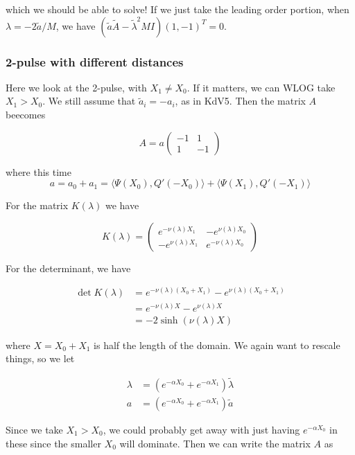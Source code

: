 \documentclass[12pt]{article}
\begin{document}
which we should be able to solve! If we just take the leading order portion, when $\lambda = -2 \tilde{a} / M$, we have $(\tilde{a} \tilde{A} - \tilde{\lambda}^2 M I) (1, -1)^T = 0$.

\subsubsection{2-pulse with different distances}

Here we look at the 2-pulse, with $X_1 \neq X_0$. If it matters, we can WLOG take $X_1 > X_0$. We still assume that $\tilde{a}_i = -a_i$, as in KdV5. Then the matrix $A$ beecomes

\[
A = a \begin{pmatrix}
-1 & 1 \\
1 & -1
\end{pmatrix}
\]

where this time
\[
a = a_0 + a_1 
= \langle \Psi(X_0), Q'(-X_0) \rangle + \langle \Psi(X_1), Q'(-X_1) \rangle
\]

For the matrix $K(\lambda)$ we have

\begin{equation}
K(\lambda) = 
\begin{pmatrix}
e^{-\nu(\lambda)X_1} & -e^{\nu(\lambda)X_0} \\
-e^{\nu(\lambda)X_1} & e^{-\nu(\lambda)X_0}
\end{pmatrix}
\end{equation} 

For the determinant, we have

\begin{align*}
\det K(\lambda) &= e^{-\nu(\lambda)(X_0 + X_1)} - e^{\nu(\lambda)(X_0 + X_1)} \\
&= e^{-\nu(\lambda)X} - e^{\nu(\lambda)X} \\
&= -2 \sinh (\nu(\lambda)X)
\end{align*}

where $X = X_0 + X_1$ is half the length of the domain. We again want to rescale things, so we let 

\begin{align*}
\lambda &= (e^{-\alpha X_0} + e^{-\alpha X_1}) \tilde{\lambda} \\
a &= (e^{-\alpha X_0} + e^{-\alpha X_1}) \tilde{a}
\end{align*}

Since we take $X_1 > X_0$, we could probably get away with just having $e^{-\alpha X_0}$ in these since the smaller $X_0$ will dominate. Then we can write the matrix $A$ as 
\end{document}
